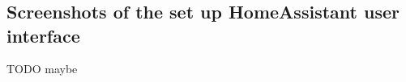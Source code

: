 \appendix
\chapter*{\fuggelek}
\setcounter{chapter}{\appendixnumber}



\section{Screenshots of the set up HomeAssistant user interface}
TODO maybe
